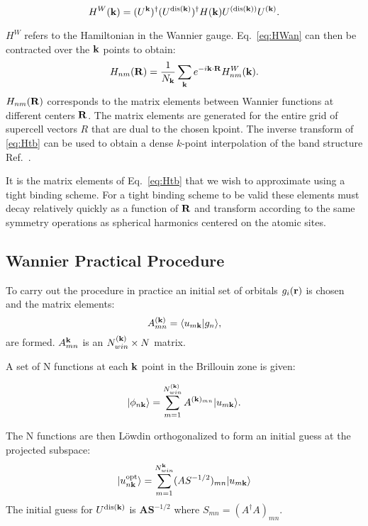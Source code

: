 \begin{equation}
\label{eq:HWan}
H^{W}({\bf k}) = (U^{{\bf k}})^{\dagger}(U^{{\rm dis}({\bf k})})^{\dagger}H({\bf k})U^{({\rm dis}({\bf k}))}U^{({\bf k})}.
\end{equation}

$H^{W}$ refers to the Hamiltonian in the Wannier gauge. Eq.~\ref{eq:HWan} can then be contracted
over the ${\bf k}$ points to obtain:
%
\begin{equation}
\label{eq:Htb}
H_{nm}({\bf R}) = \frac{1}{N_{{\bf k}}} \sum_{{\bf k}} e^{-i{\bf k}\cdot{\bf R}}H_{nm}^{W}({\bf k}).
\end{equation}
%
$H_{nm}({\bf R})$ corresponds to the matrix elements between Wannier functions at different centers ${\bf R}$. 
The matrix elements are generated for the entire grid of supercell vectors $R$ that
are dual to the chosen kpoint. The inverse transform of \ref{eq:Htb} can be used to obtain a
dense $k$-point interpolation of the band structure Ref.~\cite{yates07}.

It is the matrix elements of Eq.~\ref{eq:Htb} that we wish to approximate using a tight binding scheme.
For a tight binding scheme to be valid these elements must decay relatively quickly 
as a function of ${\bf R}$ and transform according to the same symmetry operations as spherical harmonics
centered on the atomic sites. 

\subsection{Wannier Practical Procedure}
To carry out the procedure in practice an initial set of orbitals 
${g_{i}({\bf r})}$ is chosen and the matrix elements:
%
\begin{equation}
\label{eq:overlap}
A^{({\bf k})}_{mn} = \langle u_{m{\bf k}}|g_{n} \rangle,
\end{equation}
%
are formed. $A^{{\bf k}}_{mn}$ is an $N^{({\bf k})}_{win} \times N$ matrix. 

A set of N functions at each ${\bf k}$ point in the Brillouin zone is given:

\begin{equation}
|\phi_{n{\bf k}} \rangle = \sum_{m=1}^{N^{({\bf k})}_{win}} A^{({\bf k})_{mn}} |u_{m{\bf k}}\rangle.
\end{equation}

The N functions are then L\"owdin orthogonalized to form an 
initial guess at the projected subspace:
%
\begin{equation}
|u^{\rm opt}_{n{\bf k}} \rangle = \sum_{m=1}^{N^{{\bf k}}_{win}}(AS^{-1/2})_{mn}|u_{m{\bf k}}\rangle
\end{equation}
%
The initial guess for $U^{\rm dis ({\bf k})}$ is $\mathbf{A}\mathbf{S}^{-1/2}$ 
where $S_{mn}=(A^{\dagger}A)_{mn}$.

